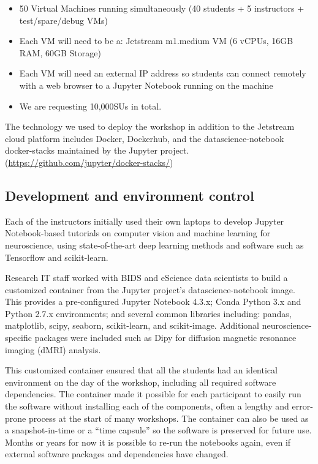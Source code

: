 \begin{itemize}
\item 50 Virtual Machines running simultaneously (40 students + 5 instructors +
test/spare/debug VMs)
\item Each VM will need to be a: Jetstream m1.medium VM (6 vCPUs, 16GB RAM, 60GB
  Storage)
\item Each VM will need an external IP address so students can connect remotely
  with a web browser to a Jupyter Notebook running on the machine
\item We are requesting 10,000SUs in total.
\end{itemize}


The technology we used to deploy the workshop in addition to the Jetstream cloud
platform includes Docker, Dockerhub, and the datascience-notebook docker-stacks
maintained by the Jupyter project. (\url{https://github.com/jupyter/docker-stacks/})

\subsection{Development and environment control}

Each of the instructors initially used their own laptops to develop Jupyter
Notebook-based tutorials on computer vision and machine learning for
neuroscience, using state-of-the-art deep learning methods and software such as
Tensorflow and scikit-learn.

Research IT staff worked with BIDS and eScience data scientists to build a
customized container from the Jupyter project’s datascience-notebook image. This
provides a pre-configured Jupyter Notebook 4.3.x; Conda Python 3.x and Python
2.7.x environments; and several common libraries including: pandas, matplotlib,
scipy, seaborn, scikit-learn, and scikit-image. Additional neuroscience-specific
packages were included such as Dipy for diffusion magnetic resonance imaging
(dMRI) analysis.

This customized container ensured that all the students had an identical
environment on the day of the workshop, including all required software
dependencies. The container made it possible for each participant to easily run
the software without installing each of the components, often a lengthy and
error-prone process at the start of many workshops. The container can also be
used as a snapshot-in-time or a ``time capsule'' so the software is preserved for
future use. Months or years for now it is possible to re-run the notebooks
again, even if external software packages and dependencies have changed.

